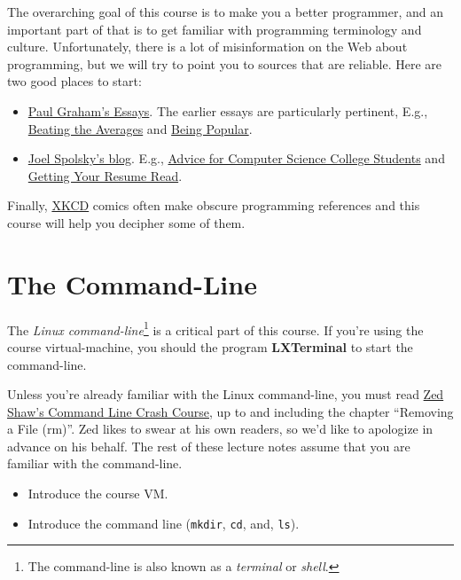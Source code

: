 \documentclass{book}
\begin{document}
The overarching goal of this course is to make you a better programmer,
and an important part of that is to get familiar with programming terminology
and culture. Unfortunately, there is a lot of misinformation on the Web
about programming, but we will try to point you to sources that are reliable.
Here are two good places to start:
%
\begin{itemize}

  \item \href{http://paulgraham.com/articles.html}{Paul Graham's Essays}.
  The earlier essays are particularly pertinent, E.g.,
  \href{http://paulgraham.com/avg.html}{Beating the Averages} and
  \href{http://paulgraham.com/popular.html}{Being Popular}.

  \item \href{http://www.joelonsoftware.com}{Joel Spolsky's blog}. E.g.,
  \href{http://www.joelonsoftware.com/articles/CollegeAdvice.html}
  {Advice for Computer Science College Students}
  and \href{http://www.joelonsoftware.com/articles/ResumeRead.html}
  {Getting Your Resume Read}.

\end{itemize}

Finally, \href{http://xkcd.com}{XKCD} comics often make obscure programming
references and this course will help you decipher some of them.

\section{The Command-Line}

The \emph{Linux command-line}\footnote{The command-line is also known as a
\emph{terminal} or \emph{shell}.} is  a critical part of this course. If you're
using the course virtual-machine, you should the program \textbf{LXTerminal}
to start the command-line.


Unless you're already familiar with the Linux command-line, you must read
\href{http://learncodethehardway.org/cli/book/cli-crash-course.html}{Zed Shaw's Command Line Crash Course},
up to and including the chapter ``Removing a File (rm)''. Zed likes to swear at
his own readers, so we'd like to apologize in advance on his behalf. The rest
of these lecture notes assume that you are familiar with the command-line.

\begin{instructor}
\begin{itemize}

\item Introduce the course VM.

\item  Introduce the command line (\verb|mkdir|, \verb|cd|, and, \verb|ls|).
\end{itemize}

\end{instructor}
\end{document}

